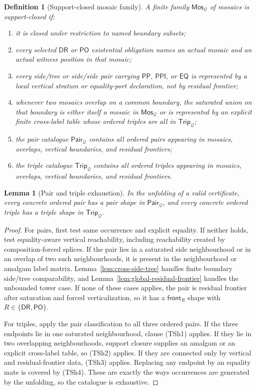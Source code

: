 \documentclass[11pt]{article}
\newtheorem{lemma}[theorem]{Lemma}
\newtheorem{definition}[theorem]{Definition}
\newcommand{\EQ}{\mathsf{EQ}}
\newcommand{\DR}{\mathsf{DR}}
\newcommand{\PO}{\mathsf{PO}}
\newcommand{\PP}{\mathsf{PP}}
\newcommand{\PPI}{\mathsf{PPI}}
\newcommand{\Q}{\mathcal Q}
\newcommand{\Mos}{\mathsf{Mos}}
\newcommand{\Pair}{\mathsf{Pair}}
\newcommand{\Trip}{\mathsf{Trip}}
\newcommand{\front}{\mathsf{front}}
\begin{document}
\begin{definition}[Support-closed mosaic family]\label{def:support-closed}
A finite family $\Mos_\Q$ of mosaics is support-closed if:
\begin{enumerate}[label=(SC\arabic*)]
\item it is closed under restriction to named boundary subsets;
\item every selected $\DR$ or $\PO$ existential obligation names an actual mosaic and an actual witness position in that mosaic;
\item every side/tree or side/side pair carrying $\PP$, $\PPI$, or $\EQ$ is represented by a local vertical stratum or equality-port declaration, not by residual frontier;
\item whenever two mosaics overlap on a common boundary, the saturated union on that boundary is either itself a mosaic in $\Mos_\Q$ or is represented by an explicit finite cross-label table whose ordered triples are all in $\Trip_\Q$;
\item the pair catalogue $\Pair_\Q$ contains all ordered pairs appearing in mosaics, overlaps, vertical boundaries, and residual frontiers;
\item the triple catalogue $\Trip_\Q$ contains all ordered triples appearing in mosaics, overlaps, vertical boundaries, and residual frontiers.
\end{enumerate}
\end{definition}

\begin{lemma}[Pair and triple exhaustion]\label{lem:pair-triple-exhaustion}
In the unfolding of a valid certificate, every concrete ordered pair has a pair shape in $\Pair_\Q$, and every concrete ordered triple has a triple shape in $\Trip_\Q$.
\end{lemma}

\begin{proof}
For pairs, first test same occurrence and explicit equality.  If neither holds, test equality-aware vertical reachability, including reachability created by composition-forced splices.  If the pair lies in a saturated side neighbourhood or in an overlap of two such neighbourhoods, it is present in the neighbourhood or amalgam label matrix.  Lemma~\ref{lem:cross-side-tree} handles finite boundary side/tree comparability, and Lemma~\ref{lem:global-residual-frontier} handles the unbounded tower case.  If none of these cases applies, the pair is residual frontier after saturation and forced verticalization, so it has a $\front_R$ shape with $R\in\{\DR,\PO\}$.

For triples, apply the pair classification to all three ordered pairs.  If the three endpoints lie in one saturated neighbourhood, clause (TSh1) applies.  If they lie in two overlapping neighbourhoods, support closure supplies an amalgam or an explicit cross-label table, so (TSh2) applies.  If they are connected only by vertical and residual-frontier data, (TSh3) applies.  Replacing any endpoint by an equality mate is covered by (TSh4).  These are exactly the ways occurrences are generated by the unfolding, so the catalogue is exhaustive.
\end{proof}
\end{document}
